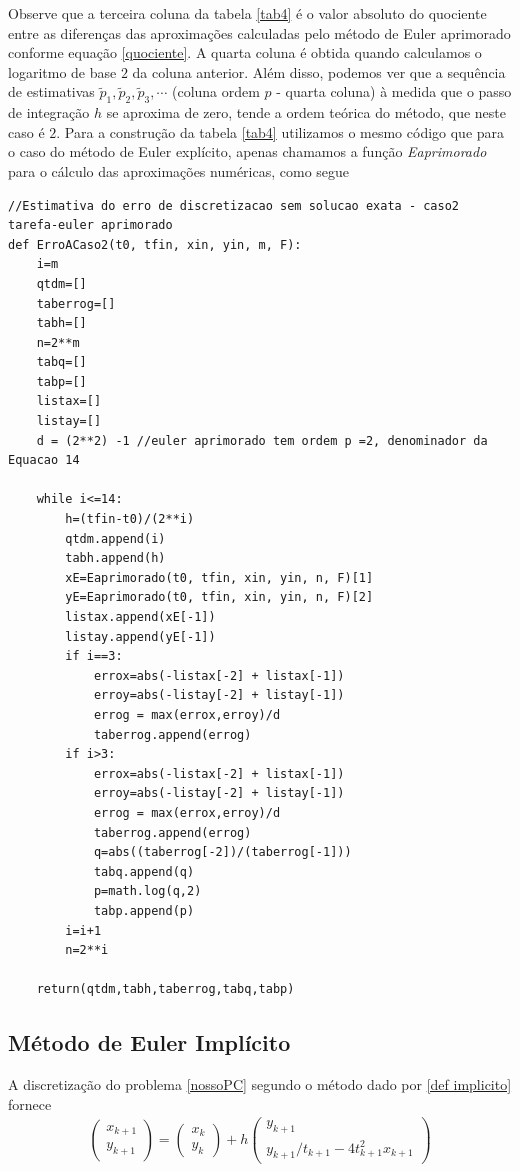 \documentclass[amsmath,amssymb,floatfix]{revtex4}
\begin{document}
Observe que a terceira coluna da tabela \ref{tab4} é o valor absoluto do quociente entre as diferenças das aproximações calculadas pelo método de Euler aprimorado conforme equação \eqref{quociente}. A quarta coluna é obtida quando calculamos o logaritmo de base $2$ da coluna anterior. Além disso, podemos ver que a sequência de estimativas $\tilde{p}_1, \tilde{p}_2, \tilde{p}_3, \cdots$ (coluna ordem $p$ - quarta coluna) à medida que o passo de integração $h$ se aproxima de zero, tende a ordem teórica do método, que neste caso é $2$. Para a construção da tabela \ref{tab4} utilizamos o mesmo código que para o caso do método de Euler explícito, apenas chamamos a função \textit{Eaprimorado} para o cálculo das aproximações numéricas, como segue
\begin{lstlisting}
//Estimativa do erro de discretizacao sem solucao exata - caso2 tarefa-euler aprimorado
def ErroACaso2(t0, tfin, xin, yin, m, F):
    i=m
    qtdm=[]
    taberrog=[]
    tabh=[]
    n=2**m
    tabq=[]
    tabp=[]
    listax=[]
    listay=[]
    d = (2**2) -1 //euler aprimorado tem ordem p =2, denominador da Equacao 14
        
    while i<=14:
        h=(tfin-t0)/(2**i)
        qtdm.append(i)
        tabh.append(h)
        xE=Eaprimorado(t0, tfin, xin, yin, n, F)[1]
        yE=Eaprimorado(t0, tfin, xin, yin, n, F)[2]
        listax.append(xE[-1])
        listay.append(yE[-1])
        if i==3:
            errox=abs(-listax[-2] + listax[-1])
            erroy=abs(-listay[-2] + listay[-1])
            errog = max(errox,erroy)/d
            taberrog.append(errog)
        if i>3:
            errox=abs(-listax[-2] + listax[-1])
            erroy=abs(-listay[-2] + listay[-1])
            errog = max(errox,erroy)/d
            taberrog.append(errog)           
            q=abs((taberrog[-2])/(taberrog[-1]))
            tabq.append(q)
            p=math.log(q,2)
            tabp.append(p)
        i=i+1
        n=2**i
     
    return(qtdm,tabh,taberrog,tabq,tabp)
    \end{lstlisting}

\subsection{Método de Euler Implícito}
A discretização do problema \eqref{nossoPC} segundo o método dado por \eqref{def implicito} fornece 
\begin{eqnarray}\label{Implicito}
\begin{pmatrix}  x_{k+1} \\ y_{k+1} \end{pmatrix}
 = \begin{pmatrix} x_k \\ y_k \end{pmatrix}
 +h \begin{pmatrix} y_{k+1} \\ y_{k+1}/t_{k+1} - 4t_{k+1}^2x_{k+1}
 \end{pmatrix}
 \end{eqnarray}
 
\end{document}
